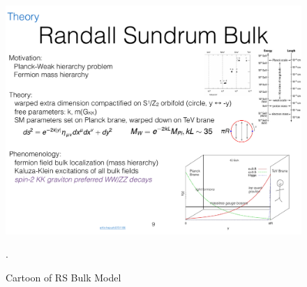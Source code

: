 \begin{figure}[h!]
  \centering
  \includegraphics[width=\hsize]{figures/Theory/RS_cartoon.pdf}
  \caption{Cartoon of RS Bulk Model}. 
  \label{fig:RS_cartoon}
\end{figure}
\FloatBarrier

